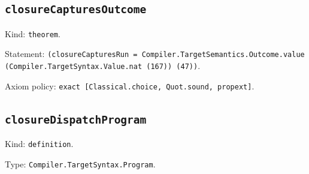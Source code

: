 \documentclass[11pt]{article}
\begin{document}
\subsection*{\texttt{closureCapturesOutcome}}
\noindent Kind: \texttt{theorem}.\par
\noindent Statement: \texttt{(closureCapturesRun = Compiler.TargetSemantics.Outcome.value (Compiler.TargetSyntax.Value.nat (167)) (47))}.\par
\noindent Axiom policy: \texttt{exact [Classical.choice, Quot.sound, propext]}.\par
\subsection*{\texttt{closureDispatchProgram}}
\noindent Kind: \texttt{definition}.\par
\noindent Type: \texttt{Compiler.TargetSyntax.Program}.\par
\end{document}
